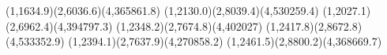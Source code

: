 {(1,1634.9)(2,6036.6)(4,365861.8)}
{(1,2130.0)(2,8039.4)(4,530259.4)}
{(1,2027.1)(2,6962.4)(4,394797.3)}
{(1,2348.2)(2,7674.8)(4,402027)}
{(1,2417.8)(2,8672.8)(4,533352.9)}
{(1,2394.1)(2,7637.9)(4,270858.2)}
{(1,2461.5)(2,8800.2)(4,368669.7)}